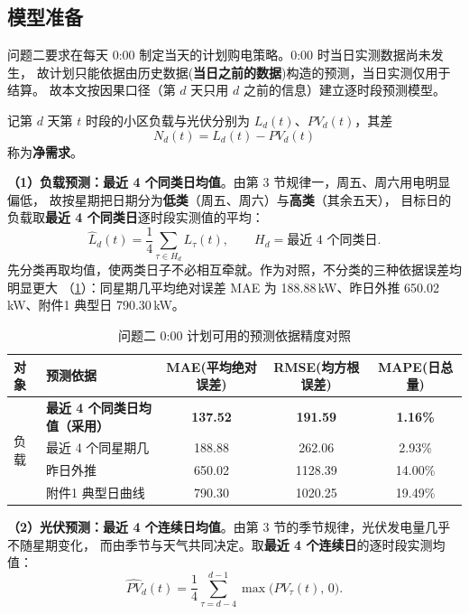 \documentclass[withoutpreface,bwprint]{cumcmthesis}
\begin{document}
\subsection{模型准备}

问题二要求在每天 0:00 制定当天的计划购电策略。0:00 时当日实测数据尚未发生，
故计划只能依据由历史数据(\textbf{当日之前的数据})构造的预测，当日实测仅用于结算。
故本文按因果口径（第 $d$ 天只用 $d$ 之前的信息）建立逐时段预测模型。

记第 $d$ 天第 $t$ 时段的小区负载与光伏分别为 $L_d(t)$、$PV_d(t)$，其差
\begin{equation}
N_d(t)=L_d(t)-PV_d(t)
\label{eq:netload}
\end{equation}
称为\textbf{净需求}。

\textbf{（1）负载预测：最近 4 个同类日均值}。由第 3 节规律一，周五、周六用电明显偏低，
故按星期把日期分为\textbf{低类}（周五、周六）与\textbf{高类}（其余五天），
目标日的负载取\textbf{最近 4 个同类日}逐时段实测值的平均：
\begin{equation}
\hat L_d(t)=\frac{1}{4}\sum_{\tau\in H_d}L_\tau(t),\qquad H_d=\text{最近 4 个同类日}.
\label{eq:basisL}
\end{equation}
先分类再取均值，使两类日子不必相互牵就。作为对照，不分类的三种依据误差均明显更大
（\cref{tab:fcacc}）：同星期几平均绝对误差 MAE 为 188.88\,kW、昨日外推 650.02\,kW、附件1 典型日 790.30\,kW。

\begin{table}[htbp]
\centering
\caption{问题二 0:00 计划可用的预测依据精度对照}
\label{tab:fcacc}
\begin{tabular}{@{}llccc@{}}
\toprule
对象 & 预测依据 & MAE(平均绝对误差) & RMSE(均方根误差) & MAPE(日总量) \\
\midrule
\multirow{4}{*}{负载}
& \textbf{最近 4 个同类日均值（采用）} & \textbf{137.52} & \textbf{191.59} & \textbf{1.16\%} \\
& 最近 4 个同星期几 & 188.88 & 262.06 & 2.93\% \\
& 昨日外推 & 650.02 & 1128.39 & 14.00\% \\
& 附件1 典型日曲线 & 790.30 & 1020.25 & 19.49\% \\
\bottomrule
\end{tabular}
\end{table}

\textbf{（2）光伏预测：最近 4 个连续日均值}。由第 3 节的季节规律，光伏发电量几乎不随星期变化，
而由季节与天气共同决定。取\textbf{最近 4 个连续日}的逐时段实测均值：
\begin{equation}
\widehat{PV}_d(t)=\frac{1}{4}\sum_{\tau=d-4}^{d-1}\max\big(PV_\tau(t),\,0\big).
\label{eq:basisPV}
\end{equation}
\end{document}
